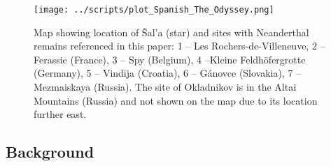 \documentclass[a4paper,10pt]{article}
\begin{document}
\begin{figure}
	\centering
	\texttt{[image: ../scripts/plot\_Spanish\_The\_Odyssey.png]}
	\caption{Map showing location of Šal’a (star) and sites with Neanderthal remains referenced in this paper: 1 -- Les Rochers-de-Villeneuve, 2 -- Ferassie (France), 3 -- Spy (Belgium), 4 --Kleine Feldhöfergrotte (Germany), 5 -- Vindija (Croatia), 6 -- Gánovce (Slovakia), 7 -- Mezmaiskaya (Russia). The site of Okladnikov is in the Altai Mountains (Russia) and not shown on the map due to its location further east.}
	\label{fig:map}
\end{figure}


\subsection{Background}

 
 
\end{document}
